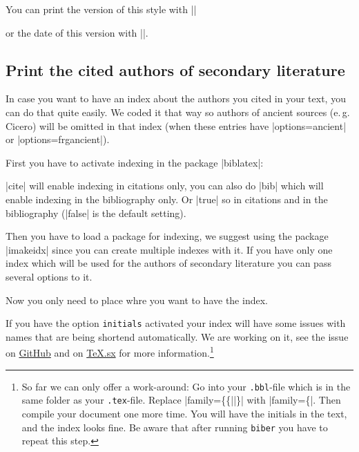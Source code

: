 \documentclass[a4paper,
10pt,
greek,
french,
spanish,
italian,
ngerman,
english
]{ltxdoc}
\begin{document}
You can print the version of this style with |\archaeologieversion| 
\begin{example}
\archaeologieversion
\end{example}
or the date of this version with |\archaeologiedate|.
\begin{example}
\archaeologiedate
\end{example}

\subsection{Print the cited authors of secondary literature}
In case you want to have an index about the authors you cited in your text,
you can do that quite easily.
We coded it that way so authors of ancient sources (e.\,g. Cicero) will be omitted in that index (when these entries have |options={ancient}| or |options={frgancient}|).

First you have to activate indexing in the package |biblatex|:
\begin{code}
\usepackage[style=archaeologie,%
          indexing=cite,
          *@@*]{biblatex}
\end{code}
|cite| will enable indexing in citations only, 
you can also do |bib| which will enable indexing in the bibliography only.
Or |true| so in citations and in the bibliography (|false| is the default setting).

Then you have to load a package for indexing,
we suggest using the package |imakeidx| since you can create multiple indexes with it.
If you have only one index which will be used for the authors of secondary literature you can pass several options to it.
 \begin{code}
\usepackage{imakeidx}
\makeindex[%
  title=Index of  authors,
  columns=3,
]
\end{code}   

Now you only need to place  whre you want to have the index.
\begin{marker}
If you have the option \texttt{initials} activated your index will have some issues with names that are being shortend automatically.\label{initials:index}
We are working on it, see the issue on \href{https://github.com/LukasCBossert/biblatex-archaeologie/issues/97}{GitHub} and on \href{http://tex.stackexchange.com/q/330971/98739}{\TeX.sx} for more information.\footnote{So far we can only offer a work-around:
Go into your \texttt{.bbl}-file which is in the same folder as your \texttt{.tex}-file.
Replace |family=\{\{||\}| with |family=\{|.
Then compile your document one more time. You will have the initials in the text, 
and the index looks fine. 
Be aware that after running \texttt{biber} you have to repeat this step.}
\end{marker}
\end{document}
